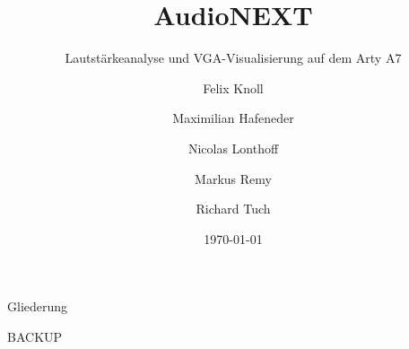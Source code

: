 \documentclass[aspectratio=43, 10pt]{beamer}
\title[AudioNEXT]{AudioNEXT}
\subtitle{Lautstärkeanalyse und VGA-Visualisierung auf dem Arty A7}
\author[Team 05 -- Die Audiophilen]{
    Felix Knoll \and
    Maximilian Hafeneder \and
    Nicolas Lonthoff \and
    Markus Remy \and
    Richard Tuch
}
\institute[]{Team 05 -- Die Audiophilen \\ CSA - Computer System Architektur}
\date{\today}
\begin{document}
\begin{frame}
    \titlepage
\end{frame}

\begin{frame}{Gliederung}
    \tableofcontents
\end{frame}











\begin{frame}{BACKUP}
\end{frame}





\end{document}
